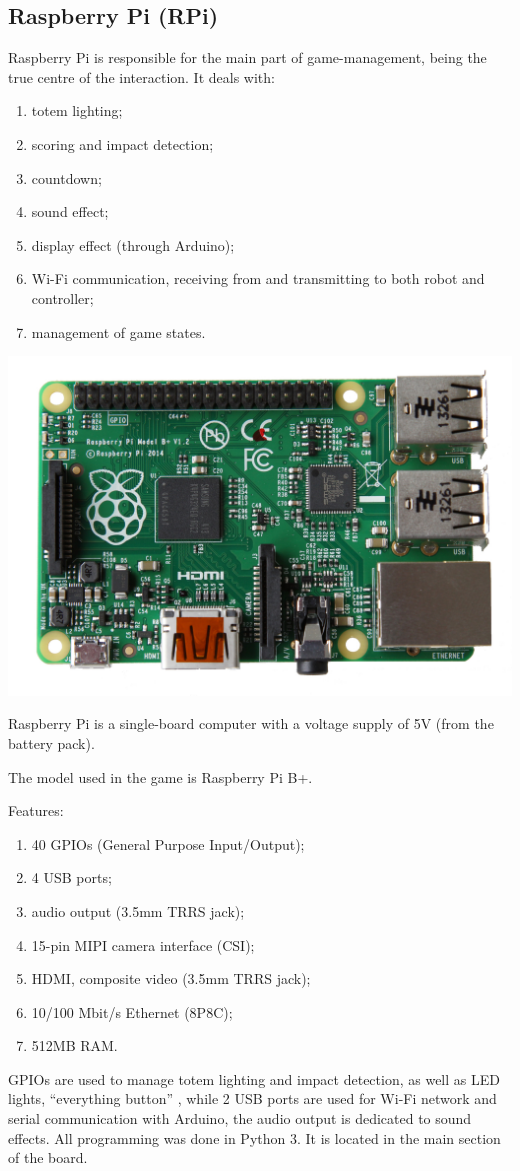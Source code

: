 \documentclass[a4paper,twoside]{book}
\begin{document}
\begin{appendices}
\section{Raspberry Pi (RPi)}
\label{app:RPi}
\beforelist* Raspberry Pi is responsible for the main part of game-management, being the true centre of the interaction. It deals with:
\begin{enumerate}
\item totem lighting;
\item scoring and impact detection;
\item countdown;
\item sound effect;
\item display effect (through Arduino);
\item Wi-Fi communication, receiving from and transmitting to both robot and controller;
\item management of game states.
\end {enumerate}

\includegraphics[width=0.5\linewidth]{img/RPi}

Raspberry Pi is a single-board computer with a voltage supply of 5V (from the battery pack).

The model used in the game is Raspberry Pi B+.

\beforelist Features:
\begin{enumerate}
\item 40 GPIOs (General Purpose Input/Output);
\item 4 USB ports;
\item audio output (3.5mm TRRS jack);
\item 15-pin MIPI camera interface (CSI);
\item HDMI, composite video (3.5mm TRRS jack);
\item 10/100 Mbit/s Ethernet (8P8C);
\item 512MB RAM.
\end{enumerate}
\afterlist*
GPIOs are used to manage totem lighting and impact detection, as well as  LED lights, \textquotedblleft{}everything button\textquotedblright{} , while 2 USB ports are used for Wi-Fi network and serial communication with Arduino, the audio output is dedicated to sound effects. All programming was done in Python 3.
It is located in the main section of the board.


\end{appendices}
\end{document}
